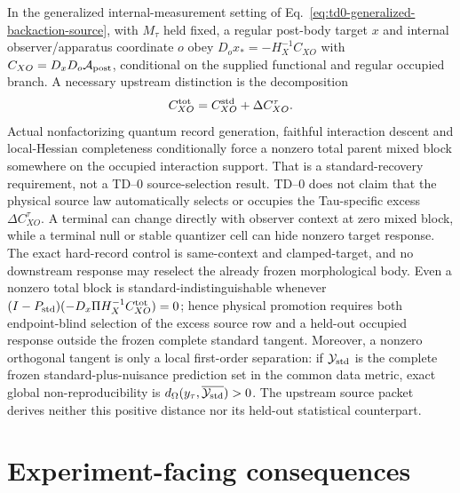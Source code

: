 \documentclass[11pt,a4paper]{article}
\theoremstyle{remark}
\begin{document}
In the generalized internal-measurement setting of
Eq.~\eqref{eq:td0-generalized-backaction-source}, with $M_\tau$ held fixed, a
regular post-body target $x$ and internal observer/apparatus coordinate $o$
obey $D_o x_*=-H_X^{-1}C_{XO}$ with $C_{XO}=D_xD_o\mathcal A_{\rm post}$,
conditional on the supplied functional and regular occupied branch.  A
necessary upstream distinction is the decomposition
\begin{equation}
 C_{XO}^{\rm tot}=C_{XO}^{\rm std}+\Delta C_{XO}^{\tau}.
 \label{eq:td0-excess-backaction-decomposition}
\end{equation}
Actual nonfactorizing quantum record generation, faithful interaction descent
and local-Hessian completeness conditionally force a nonzero total parent
mixed block somewhere on the occupied interaction support.  That is a
standard-recovery requirement, not a TD--0 source-selection result.  TD--0
does not claim that the physical source law automatically selects or occupies
the Tau-specific excess $\Delta C_{XO}^{\tau}$.  A terminal can change directly
with observer context at zero mixed block, while a terminal null or stable
quantizer cell can hide nonzero target response.  The exact hard-record control
is same-context and clamped-target, and no downstream response may reselect
the already frozen morphological body.  Even a nonzero total block is
standard-indistinguishable whenever
$(I-P_{\rm std})(-D_x\Pi H_X^{-1}C_{XO}^{\rm tot})=0$; hence physical
promotion requires both endpoint-blind selection of the excess source row and
a held-out occupied response outside the frozen complete standard tangent.
Moreover, a nonzero orthogonal tangent is only a local first-order separation:
if $\mathcal Y_{\rm std}$ is the complete frozen standard-plus-nuisance
prediction set in the common data metric, exact global non-reproducibility is
$d_\Omega(y_\tau,\overline{\mathcal Y_{\rm std}})>0$.  The upstream source
packet derives neither this positive distance nor its held-out statistical
counterpart.

\section{Experiment-facing consequences}
\end{document}
